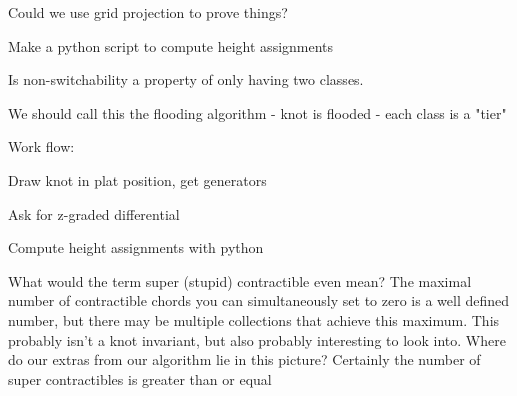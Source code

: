 \documentclass[General-Information/editedlog.tex]{subfiles}
\begin{document}
\begin{question}
Could we use grid projection to prove things?
\end{question}

\begin{question}
Make a python script to compute height assignments

\end{question}

\begin{question}
Is non-switchability a property of only having two classes.
\end{question}

\begin{question}

We should call this the flooding algorithm - knot is flooded  - each class is a "tier" 
\end{question}

\begin{question}

Work flow:



Draw knot in plat position, get generators

Ask for z-graded differential

Compute height assignments with python

\end{question}

\begin{question}
    What would the term super (stupid) contractible even mean? The maximal number of contractible chords you can simultaneously set to zero is a well defined number, but there may be multiple collections that achieve this maximum. This probably isn't a knot invariant, but also probably interesting to look into. Where do our extras from our algorithm lie in this picture? Certainly the number of super contractibles is greater than or equal
\end{question}
\end{document}

